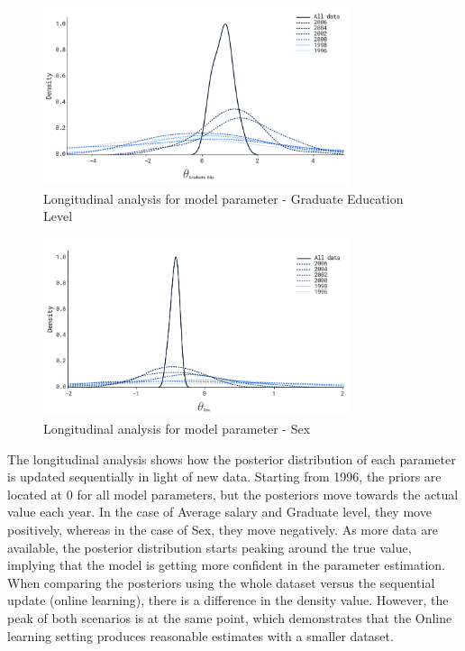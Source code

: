 \begin{figure}[H]
    \centering
    \includegraphics[width=0.8\textwidth]{images/ch5_online_learning/online_learning_grad.png}
    \caption{Longitudinal analysis for model parameter - Graduate Education Level }
    \label{fig:online_learning_grad}
\end{figure}

\begin{figure}[H]
    \centering
    \includegraphics[width=0.8\textwidth]{images/ch5_online_learning/online_learning_gender.png}
    \caption{Longitudinal analysis for model parameter - Sex }
    \label{fig:online_learning_sex}
\end{figure}

The longitudinal analysis shows how the posterior distribution of each parameter is updated sequentially in light of new data. Starting from 1996, the priors are located at 0 for all model parameters, but the posteriors move towards the actual value each year. In the case of Average salary and Graduate level, they move positively, whereas in the case of Sex, they move negatively. As more data are available, the posterior distribution starts peaking around the true value, implying that the model is getting more confident in the parameter estimation. When comparing the posteriors using the whole dataset versus the sequential update (online learning), there is a difference in the density value. However, the peak of both scenarios is at the same point, which demonstrates that the Online learning setting produces reasonable estimates with a smaller dataset. 

